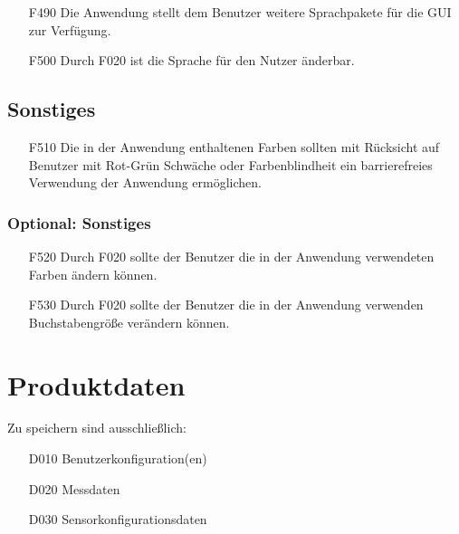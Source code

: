 \documentclass[parskip=full]{scrartcl}
\begin{document}
\begin{itemize}

\item[F490] Die Anwendung stellt dem Benutzer weitere Sprachpakete für die \gls{GUI} zur Verfügung.
\item[F500] Durch F020 ist die Sprache für den Nutzer änderbar.

\end{itemize}

\subsection{Sonstiges}

\begin{itemize}

\item[F510] Die in der Anwendung enthaltenen Farben sollten mit Rücksicht auf Benutzer mit Rot-Grün Schwäche oder Farbenblindheit ein barrierefreies Verwendung der Anwendung ermöglichen.

\end{itemize}

\subsubsection{Optional: Sonstiges}

\begin{itemize}

\item[F520] Durch F020 sollte der Benutzer die in der Anwendung verwendeten Farben ändern können.
\item[F530] Durch F020 sollte der Benutzer die in der Anwendung verwenden Buchstabengröße verändern können.

\end{itemize}

\section{Produktdaten}\label{produktdaten}

Zu speichern sind ausschließlich:

\begin{itemize}

\item[D010] \gls{Benutzerkonfiguration}(en)
\item[D020] Messdaten
\item[D030] Sensorkonfigurationsdaten

\end{itemize}
\end{document}
